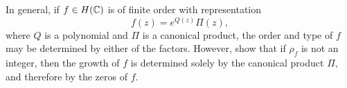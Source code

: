 In general, if $f \in H(\mathbb{C})$ is of finite order with representation
$$ f(z) = e^{Q(z)} \Pi(z), $$
where $Q$ is a polynomial and $\Pi$ is a canonical product, the order and type of $f$ may be determined by either of the factors. However,  show that if $\rho_f$ is not an integer, then the growth of $f$ is determined solely by the canonical product $\Pi$, and therefore by the zeros of $f$.